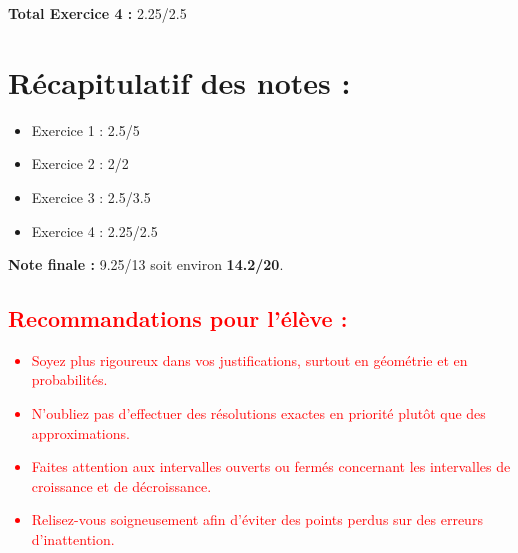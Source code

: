\documentclass{article}
\begin{document}
\textbf{Total Exercice 4 :} 2.25/2.5

\section*{Récapitulatif des notes :}

\begin{itemize}
\item Exercice 1 : 2.5/5
\item Exercice 2 : 2/2
\item Exercice 3 : 2.5/3.5
\item Exercice 4 : 2.25/2.5
\end{itemize}

\textbf{\large Note finale : } 9.25/13 soit environ \textbf{14.2/20}.

\textcolor{red}{
\section*{Recommandations pour l'élève :}
\begin{itemize}
    \item Soyez plus rigoureux dans vos justifications, surtout en géométrie et en probabilités.
    \item N'oubliez pas d'effectuer des résolutions exactes en priorité plutôt que des approximations.
    \item Faites attention aux intervalles ouverts ou fermés concernant les intervalles de croissance et de décroissance.
    \item Relisez-vous soigneusement afin d'éviter des points perdus sur des erreurs d'inattention.
\end{itemize}
}
\end{document}
